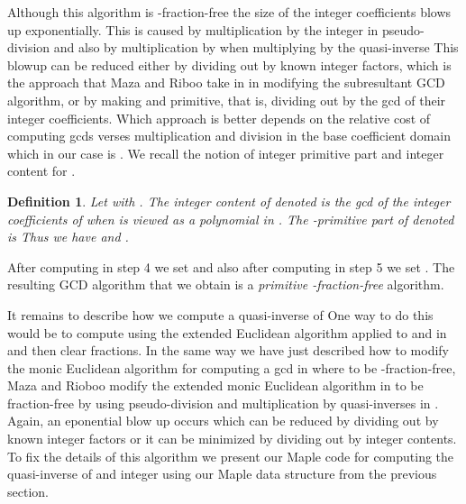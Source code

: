 \documentclass[10pt]{article}
\newtheorem{definition}{Definition}
\begin{document}
\bigskip
\noindent Although this algorithm is -fraction-free the size of
the integer coefficients blows up exponentially.  This is caused by
multiplication by the integer  in pseudo-division and also by
multiplication by  when multiplying by the quasi-inverse 
This blowup can be reduced either by dividing out by known integer
factors, which is the approach that Maza and Riboo take in
\cite{Maza} in modifying the subresultant GCD algorithm, or by
making  and  primitive, that is, dividing out by the
gcd of their integer coefficients. Which approach is better depends
on the relative cost of computing gcds verses multiplication and
division in the base coefficient domain which in our case is .
We recall the notion of integer primitive part and integer content
for .

\begin{definition}
Let  with .
The integer content of  denoted  is the gcd of the
integer coefficients of  when  is viewed as a polynomial in .
The -primitive part of  denoted  is 
Thus we have  and .
\end{definition}
After computing  in step 4 we set  and
also after computing  in step 5 we set .
The resulting GCD algorithm that we obtain is a {\em primitive -fraction-free}
algorithm.

It remains to describe how we compute a quasi-inverse of 
One way to do this would be to compute  using the extended Euclidean algorithm
applied to  and  in  and then clear fractions.
In the same way we have just described how to modify the monic Euclidean algorithm
for computing a gcd in  where 
to be -fraction-free, Maza and Rioboo modify the extended monic Euclidean
algorithm in  to be fraction-free by using pseudo-division
and multiplication by quasi-inverses in .
Again, an eponential blow up occurs which can be reduced by dividing out by
known integer factors or it can be minimized by dividing out by integer contents.
To fix the details of this algorithm we present our Maple code for computing
the quasi-inverse of  and integer  using our Maple data structure
from the previous section.
\end{document}
